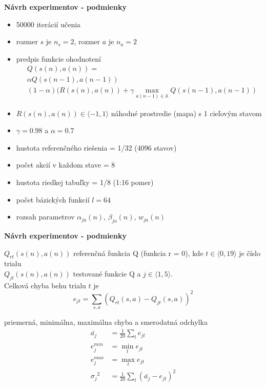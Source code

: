 \documentclass[xcolor=dvipsnames]{beamer}
\begin{document}
\begin{frame}{\bf Návrh experimentov - podmienky}

\begin{itemize}
\item 50000 iterácií učenia
\item rozmer $s$ je $n_s = 2$, rozmer $a$ je $n_a = 2$
\item predpis funkcie ohodnotení
\begin{align}
&Q(s(n),a(n)) = \nonumber \\
&\alpha Q(s(n-1),a(n-1)) \nonumber \\
&(1- \alpha)(R(s(n),a(n)) + \gamma \max_{a(n-1) \in \mathbb{A}} Q(s(n-1), a(n-1)) \nonumber
\end{align}

\item $R(s(n), a(n)) \in \langle -1, 1 \rangle$ náhodné prostredie (mapa) s 1 cieľovým stavom
\item $\gamma = 0.98$ a $\alpha = 0.7$
\item hustota referenčného riešenia = 1/32  (4096 stavov)
\item počet akcií v každom stave = 8
\item hustota riedkej tabuľky = 1/8  (1:16 pomer)
\item počet bázických funkcií $l = 64$
\item rozsah parametrov $\alpha_{ja}(n)$, $\beta_{ja}(n)$, $w_{ja}(n)$
\end{itemize}

\end{frame}


\begin{frame}{\bf Návrh experimentov - podmienky}

$Q_{rt}(s(n),a(n))$ referenčná funkcia Q (funkcia r = 0), kde $t \in \langle 0, 19 \rangle $ je číslo trialu  \\
$Q_{jt}(s(n),a(n))$ testované funkcie Q a $j \in \langle 1, 5 \rangle $. \\

Celková chyba behu trialu $t$ je \\
\begin{equation}
e_{jt} = \sum\limits_{s, a}{(Q_{rt}(s,a) - Q_{jt}(s,a))^2}  \nonumber
\end{equation}

priemerná, minimálna, maximálna chyba a smerodatná odchylka \\
\begin{align}
\bar{a_j} &= \frac{1}{20}\sum\limits_{t}{e_{jt}}  \nonumber \\
{e^{min}_j} &= \min_{t}{e_{jt}}  \nonumber \\
{e^{max}_j} &= \max_{t}{e_{jt}}  \nonumber \\
{\sigma_j}^2 &= \frac{1}{20}\sum\limits_{t}{(\bar{a_j} - e_{jt})^2}  \nonumber
\end{align}

\end{frame}
\end{document}
